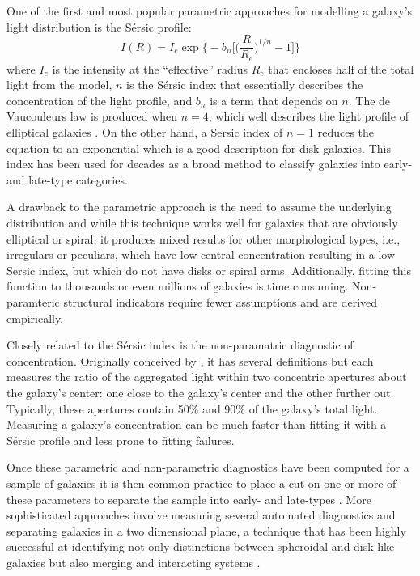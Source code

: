 One of the first and most popular parametric approaches for modelling a galaxy's light distribution is the S\'ersic profile:
\begin{equation}
I(R) = I_e \exp \Big\{-b_n\Big[\Big(\frac{R}{R_e}\Big)^{1/n}-1\Big]\Big\}
\end{equation}
where $I_e$ is the intensity at the ``effective'' radius $R_e$ that encloses half of the total light from the model, $n$ is the S\'ersic index that essentially describes the concentration of the light profile, and $b_n$ is a term that depends on $n$. The de Vaucouleurs law is produced when $n=4$, which well describes the light profile of elliptical galaxies \citep{deVaucouleurs1948}. On the other hand, a Sersic index of $n=1$ reduces the equation to an exponential which is a good description for disk galaxies. This index has been used for decades as a broad method to classify galaxies into early- and late-type categories. 

A drawback to the parametric approach is the need to assume the underlying distribution and while this technique works well for galaxies that are obviously elliptical or spiral, it produces mixed results for other morphological types, i.e., irregulars or peculiars, which have low central concentration resulting in a low Sersic index, but which do not have disks or spiral arms. Additionally, fitting this function to thousands or even millions of galaxies is time consuming. Non-paramteric structural indicators require fewer assumptions and are derived empirically.

Closely related to the S\'ersic index is the non-paramatric diagnostic of concentration. Originally conceived by \cite{Abraham1996}, it has several definitions but each measures the ratio of the aggregated light within two concentric apertures about the galaxy's center: one close to the galaxy's center and the other further out. Typically, these apertures contain 50\% and 90\% of the galaxy's total light. Measuring a galaxy's concentration can be much faster than fitting it with a S\'ersic profile and less prone to fitting failures. 

Once these parametric and non-parametric diagnostics have been computed for a sample of galaxies it is then common practice to place a cut on one or more of these parameters to separate the sample into early- and late-types \citep{Shen2003}. More sophisticated approaches involve measuring several automated diagnostics and separating galaxies in a two dimensional plane, a technique that has been highly successful at identifying not only distinctions between spheroidal and disk-like galaxies but also merging and interacting systems \citep{Lotz2004, Conselice2000, Conselice2003,Freeman2013}. 


